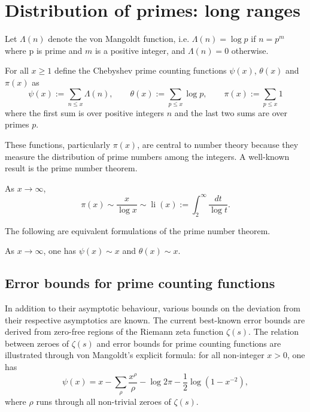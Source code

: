 \chapter{Distribution of primes: long ranges}
\label{chap:prime_counting_function}

Let $\Lambda(n)$ denote the von Mangoldt function, i.e. $\Lambda(n) = \log p$ if $n = p^m$ where p is prime and $m$ is a positive integer, and $\Lambda(n) = 0$ otherwise. 

\begin{definition}
For all $x \ge 1$ define the Chebyshev prime counting functions $\psi(x)$, $\theta(x)$ and $\pi(x)$ as
\[
\psi(x) := \sum_{n \le x}\Lambda(n),\qquad \theta(x) := \sum_{p \le x}\log p,\qquad \pi(x) := \sum_{p \le x}1
\]
where the first sum is over positive integers $n$ and the last two sums are over primes $p$.
\end{definition}

These functions, particularly $\pi(x)$, are central to number theory because they measure the distribution of prime numbers among the integers. A well-known result is the prime number theorem.

\begin{theorem}
As $x \to \infty$, 
\[
\pi(x) \sim \frac{x}{\log x} \sim \operatorname{li}(x) := \int_2^{\infty}\frac{dt}{\log t}.
\]
\end{theorem}

The following are equivalent formulations of the prime number theorem.

\begin{theorem}
As $x \to \infty$, one has $\psi(x) \sim x$ and $\theta(x) \sim x$.
\end{theorem}

\section{Error bounds for prime counting functions}
In addition to their asymptotic behaviour, various bounds on the deviation from their respective asymptotics are known. The current best-known error bounds are derived from zero-free regions of the Riemann zeta function $\zeta(s)$. The relation between zeroes of $\zeta(s)$ and error bounds for prime counting functions are illustrated through von Mangoldt's explicit formula: for all non-integer $x > 0$, one has
\[
\psi(x) = x - \sum_{\rho}\frac{x^\rho}{\rho} - \log 2\pi - \frac{1}{2}\log(1 - x^{-2}),
\]
where $\rho$ runs through all non-trivial zeroes of $\zeta(s)$.

